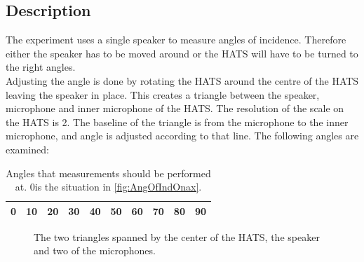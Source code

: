 \subsection{Description}\label{sec:AngleDescription}
The experiment uses a single speaker to measure angles of incidence. Therefore either the speaker has to be moved around or the HATS will have to be turned to the right angles. \\
Adjusting the angle is done by rotating the HATS around the centre of the HATS leaving the speaker in place. This creates a triangle between the speaker, microphone and inner microphone of the HATS. The resolution of the scale on the HATS is 2\degrees. The baseline of the triangle is from the microphone to the inner microphone, and angle is adjusted according to that line.
The following angles are examined:
\begin{table}[H]
	\centering
	\begin{tabular}{c c c c c c c c c c} \toprule
		0\degrees & 10\degrees & 20\degrees & 30\degrees & 40\degrees & 50\degrees & 60\degrees & 70\degrees & 80\degrees & 90\degrees \\ \bottomrule
	\end{tabular}
\label{Tab:AngleOfInciMeasAngles}
\caption{Angles that measurements should be performed at. 0\degrees  is the situation in \autoref{fig:AngOfIndOnax}.}
\end{table}
 

\begin{figure}[H]
\label{Fig:AngleOfIcidenceTriangleCalculation}
\caption{The two triangles spanned by the center of the HATS, the speaker and two of the microphones.}
\end{figure}  


